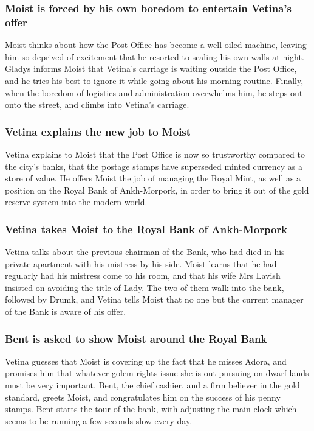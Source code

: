 \subsubsection{\Gls{Moist} is forced by his own boredom to entertain \Gls{Vetina}'s offer}
\Gls{Moist} thinks about how the Post Office has become a well-oiled machine, leaving him so
deprived of excitement that he resorted to scaling his own walls at night. \Gls{Gladys} informs
\Gls{Moist} that \Gls{Vetina}'s carriage is waiting outside the Post Office, and he tries his best
to ignore it while going about his morning routine. Finally, when the boredom of logistics and
administration overwhelms him, he steps out onto the street, and climbs into \Gls{Vetina}'s
carriage.

\subsubsection{\Gls{Vetina} explains the new job to \Gls{Moist}}
\Gls{Vetina} explains to \Gls{Moist} that the Post Office is now so trustworthy compared to the
city's banks, that the postage stamps have superseded minted currency as a store of value. He offers
\Gls{Moist} the job of managing the Royal Mint, as well as a position on the Royal Bank of
Ankh-Morpork, in order to bring it out of the gold reserve system into the modern world.

\subsubsection{\Gls{Vetina} takes \Gls{Moist} to the Royal Bank of Ankh-Morpork}
\Gls{Vetina} talks about the previous chairman of the Bank, who had died in his private apartment
with his mistress by his side. \Gls{Moist} learns that he had regularly had his mistress come to
his room, and that his wife Mrs \Gls{Lavish} insisted on avoiding the title of Lady. The two of them
walk into the bank, followed by \Gls{Drumk}, and \Gls{Vetina} tells \Gls{Moist} that no one but
the current manager of the Bank is aware of his offer.

\subsubsection{\Gls{Bent} is asked to show \Gls{Moist} around the Royal Bank}
\Gls{Vetina} guesses that \Gls{Moist} is covering up the fact that he misses \Gls{Adora}, and
promises him that whatever golem-rights issue she is out pursuing on dwarf lands must be very
important. \Gls{Bent}, the chief cashier, and a firm believer in the gold standard, greets
\Gls{Moist}, and congratulates him on the success of his penny stamps. \Gls{Bent} starts the tour of
the bank, with adjusting the main clock which seems to be running a few seconds slow every day.

